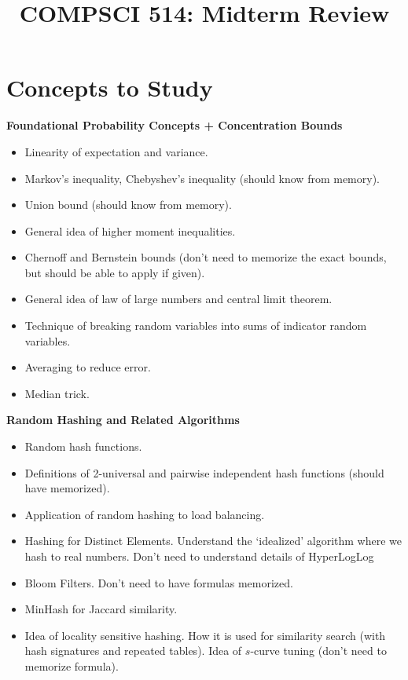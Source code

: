 \documentclass[11pt]{article}
\title{COMPSCI 514: Midterm Review}
\date{}
\begin{document}
\maketitle

\vspace{-3em}
\section{Concepts to Study}

\textbf{Foundational Probability Concepts + Concentration Bounds}
\begin{itemize}
\item Linearity of expectation and variance.
\item Markov's inequality, Chebyshev's inequality (should know from memory).
\item Union bound  (should know from memory).
\item General idea of higher moment inequalities.
\item Chernoff and Bernstein bounds (don't need to memorize the exact bounds, but should be able to apply if given).
\item General idea of law of large numbers and central limit theorem.
\item Technique of breaking random variables into sums of indicator random variables.
\item Averaging to reduce error.
\item Median trick. 
\end{itemize}

\noindent \textbf{Random Hashing and Related Algorithms}
\begin{itemize}
\item Random hash functions.
\item Definitions of 2-universal and pairwise independent hash functions (should have memorized).
\item Application of random hashing to load balancing.
\item Hashing for Distinct Elements. Understand the `idealized' algorithm where we hash to real numbers. Don't need to understand details of HyperLogLog
\item Bloom Filters. Don't need to have formulas memorized.
\item MinHash for Jaccard similarity.
\item Idea of locality sensitive hashing. How it is used for similarity  search (with hash signatures and repeated tables). Idea of $s$-curve tuning (don't need to memorize formula).
\end{itemize}
\end{document}
